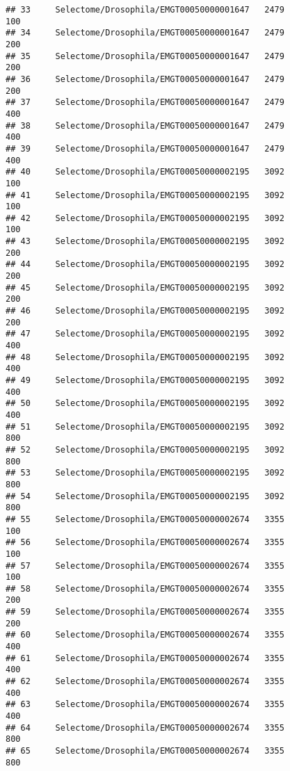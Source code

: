 \documentclass[
]{article}
\begin{document}
\begin{verbatim}
## 33     Selectome/Drosophila/EMGT00050000001647   2479                   100
## 34     Selectome/Drosophila/EMGT00050000001647   2479                   200
## 35     Selectome/Drosophila/EMGT00050000001647   2479                   200
## 36     Selectome/Drosophila/EMGT00050000001647   2479                   200
## 37     Selectome/Drosophila/EMGT00050000001647   2479                   400
## 38     Selectome/Drosophila/EMGT00050000001647   2479                   400
## 39     Selectome/Drosophila/EMGT00050000001647   2479                   400
## 40     Selectome/Drosophila/EMGT00050000002195   3092                   100
## 41     Selectome/Drosophila/EMGT00050000002195   3092                   100
## 42     Selectome/Drosophila/EMGT00050000002195   3092                   100
## 43     Selectome/Drosophila/EMGT00050000002195   3092                   200
## 44     Selectome/Drosophila/EMGT00050000002195   3092                   200
## 45     Selectome/Drosophila/EMGT00050000002195   3092                   200
## 46     Selectome/Drosophila/EMGT00050000002195   3092                   200
## 47     Selectome/Drosophila/EMGT00050000002195   3092                   400
## 48     Selectome/Drosophila/EMGT00050000002195   3092                   400
## 49     Selectome/Drosophila/EMGT00050000002195   3092                   400
## 50     Selectome/Drosophila/EMGT00050000002195   3092                   400
## 51     Selectome/Drosophila/EMGT00050000002195   3092                   800
## 52     Selectome/Drosophila/EMGT00050000002195   3092                   800
## 53     Selectome/Drosophila/EMGT00050000002195   3092                   800
## 54     Selectome/Drosophila/EMGT00050000002195   3092                   800
## 55     Selectome/Drosophila/EMGT00050000002674   3355                   100
## 56     Selectome/Drosophila/EMGT00050000002674   3355                   100
## 57     Selectome/Drosophila/EMGT00050000002674   3355                   100
## 58     Selectome/Drosophila/EMGT00050000002674   3355                   200
## 59     Selectome/Drosophila/EMGT00050000002674   3355                   200
## 60     Selectome/Drosophila/EMGT00050000002674   3355                   400
## 61     Selectome/Drosophila/EMGT00050000002674   3355                   400
## 62     Selectome/Drosophila/EMGT00050000002674   3355                   400
## 63     Selectome/Drosophila/EMGT00050000002674   3355                   400
## 64     Selectome/Drosophila/EMGT00050000002674   3355                   800
## 65     Selectome/Drosophila/EMGT00050000002674   3355                   800

\end{verbatim}
\end{document}
